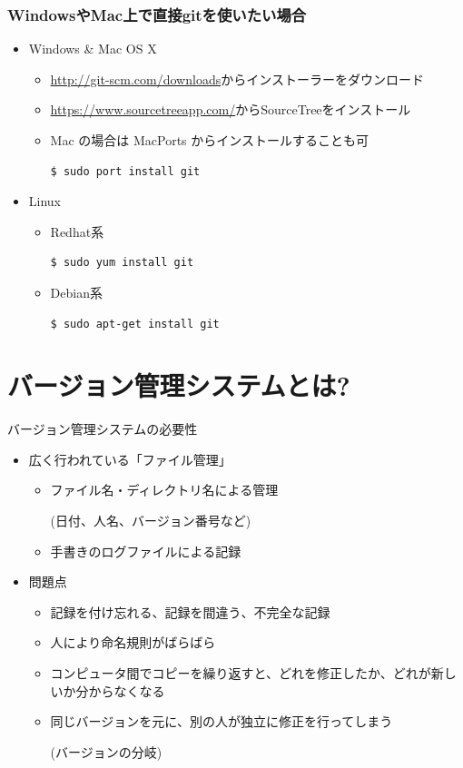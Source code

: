 \begin{frame}[t,fragile]
  \frametitle{WindowsやMac上で直接gitを使いたい場合}
  \begin{itemize}
  \item Windows \& Mac OS X
    \begin{itemize}
      \item \url{http://git-scm.com/downloads}からインストーラーをダウンロード
      \item \url{https://www.sourcetreeapp.com/}からSourceTreeをインストール
      \item Mac の場合は MacPorts からインストールすることも可
\begin{lstlisting}
$ sudo port install git
\end{lstlisting}
    \end{itemize}
  \item Linux
    \begin{itemize}
      \item Redhat系
\begin{lstlisting}
$ sudo yum install git
\end{lstlisting}
      \item Debian系
\begin{lstlisting}
$ sudo apt-get install git
\end{lstlisting}
    \end{itemize}
  \end{itemize}
\end{frame}

\section{バージョン管理システムとは?}

\begin{frame}[t,fragile]{バージョン管理システムの必要性}
  \begin{itemize}
    \setlength{\itemsep}{1em}
  \item 広く行われている「ファイル管理」
    \begin{itemize}
    \item ファイル名・ディレクトリ名による管理

      (日付、人名、バージョン番号など)
    \item 手書きのログファイルによる記録
    \end{itemize}
  \item 問題点
    \begin{itemize}
    \item 記録を付け忘れる、記録を間違う、不完全な記録
    \item 人により命名規則がばらばら
    \item コンピュータ間でコピーを繰り返すと、どれを修正したか、どれが新しいか分からなくなる
    \item 同じバージョンを元に、別の人が独立に修正を行ってしまう

      (バージョンの分岐)
    \end{itemize}
  \end{itemize}
\end{frame}

